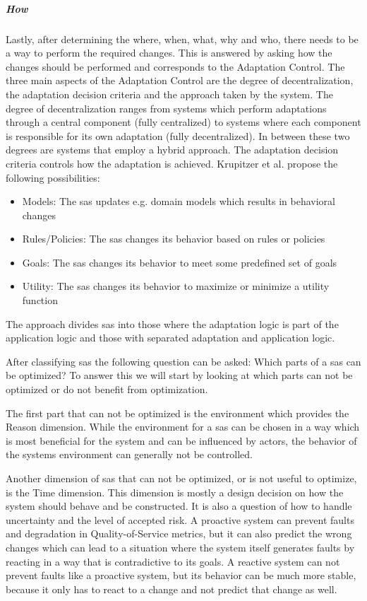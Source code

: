 \subparagraph*{How}
Lastly, after determining the where, when, what, why and who, there needs to be a way
to perform the required changes. This is answered by asking how the changes should be performed
and corresponds to the Adaptation Control.
The three main aspects of the Adaptation Control are the degree of decentralization, the adaptation decision criteria
and the approach taken by the system.
The degree of decentralization ranges from systems which perform adaptations through a central component (fully centralized)
to systems where each component is responsible for its own adaptation (fully decentralized).
In between these two degrees are systems that employ a hybrid approach.
The adaptation decision criteria controls how the adaptation is achieved.
Krupitzer et al. propose the following possibilities:
\begin{itemize}[nosep]
    \item Models: The \acrshort{sas} updates e.g. domain models which results in behavioral changes
    \item Rules/Policies: The \acrshort{sas} changes its behavior based on rules or policies
    \item Goals: The \acrshort{sas} changes its behavior to meet some predefined set of goals
    \item Utility: The \acrshort{sas} changes its behavior to maximize or minimize a utility function
\end{itemize}
The approach divides \acrshort{sas} into those where the adaptation logic is part of the application logic
and those with separated adaptation and application logic.

\noindent After classifying \acrshort{sas} the following question can be asked: Which parts of a \acrshort{sas} can be optimized?
To answer this we will start by looking at which parts can not be optimized or do not benefit from optimization.

\noindent The first part that can not be optimized is the environment which provides the Reason dimension.
While the environment for a \acrshort{sas} can be chosen in a way which is most beneficial for the system
and can be influenced by actors,
the behavior of the systems environment can generally not be controlled.

\noindent Another dimension of \acrshort{sas} that can not be optimized, or is not useful to optimize,
is the Time dimension. This dimension is mostly a design decision on how the system should behave and be constructed.
It is also a question of how to handle uncertainty and the level of accepted risk.
A proactive system can prevent faults and degradation in Quality-of-Service metrics,
but it can also predict the wrong changes which can lead to a situation where the system itself generates faults by
reacting in a way that is contradictive to its goals.
A reactive system can not prevent faults like a proactive system,
but its behavior can be much more stable, because it only has to react to a change and not predict that change as well.

